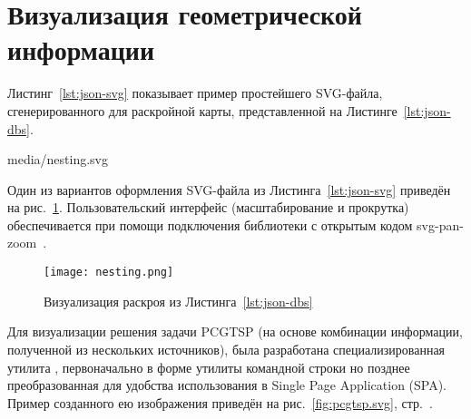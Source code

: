 
\section{
  Визуализация геометрической информации
}
\label{ch:json.view}

Листинг~\ref{lst:json-svg}
показывает пример простейшего SVG-файла,
сгенерированного для раскройной карты,
представленной на Листинге~\ref{lst:json-dbs}.


  {media/nesting.svg}

Один из вариантов оформления
SVG-файла из Листинга~\ref{lst:json-svg}
приведён на рис.~\ref{fig:json-nesting}.
Пользовательский интерфейс
(масштабирование и прокрутка)
обеспечивается при помощи подключения
библиотеки с открытым кодом
svg-pan-zoom~\cite{bi:svg-pan-zoom}.

\begin{figure}[b]
  \centering
  \texttt{[image: nesting.png]}
  \caption{Визуализация раскроя из Листинга~\ref{lst:json-dbs}}
  \label{fig:json-nesting}
\end{figure}

Для визуализации решения задачи PCGTSP
(на основе комбинации информации,
полученной из нескольких источников),
была разработана специализированная утилита
\cite{bi:j2pcgtsp},
первоначально в форме утилиты командной строки
но позднее преобразованная
для удобства использования в
Single Page Application
(SPA).
Пример созданного ею изображения
приведён на рис.~\ref{fig:pcgtsp.svg},
стр.~\pageref{fig:pcgtsp.svg}.


